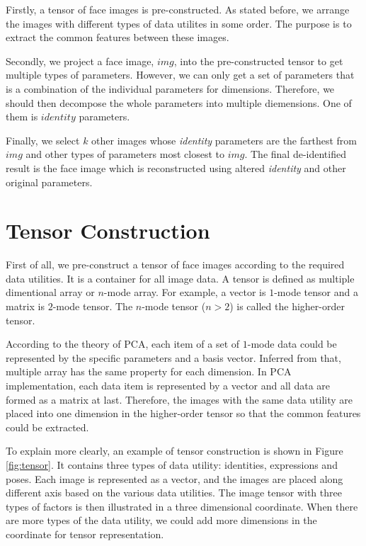 Firstly, a tensor of face images is pre-constructed. As stated before,
we arrange the images with different types of data utilites in some order.
The purpose is to extract the common features between these images.

Secondly, we project a face image, $img$,
into the pre-constructed tensor to get multiple types of parameters.
However, we can only get a set of parameters that is a combination
of the individual parameters for dimensions. Therefore, we should
then decompose the whole parameters into multiple diemensions. One
of them is $identity$ parameters.

Finally, we select $k$ other images whose {\it identity} parameters 
are the farthest from $img$ and other types of parameters most 
closest to $img$. The final de-identified result is the face image 
which is reconstructed using altered {\it identity} and other 
original parameters.

\section{Tensor Construction}

First of all, we pre-construct a tensor of face images according to
the required data utilities. It is a container for all image data.
A tensor is defined as multiple dimentional array or $n$-mode array. 
For example, a vector is $1$-mode tensor and
a matrix is $2$-mode tensor. The $n$-mode tensor ($n>2$) is called 
the higher-order tensor. 

According to the theory of PCA, each item of a set of $1$-mode data 
could be represented by the specific parameters and a basis vector. 
Inferred from that, multiple array has the same property for each
dimension. In PCA implementation, each data item is represented by
a vector and all data are formed as a matrix at last. Therefore, 
the images with the same data utility are placed into one dimension 
in the higher-order tensor so that the common features could be 
extracted. 

To explain more clearly, an example of tensor construction is shown in
Figure \ref{fig:tensor}. It contains three types of data utility:
identities, expressions and poses. Each image is represented as
a vector, and the images are placed along different axis based 
on the various data utilities. The image tensor with three types of factors
is then illustrated in a three dimensional coordinate. When there are
more types of the data utility, we could add more dimensions in the coordinate
for tensor representation.

